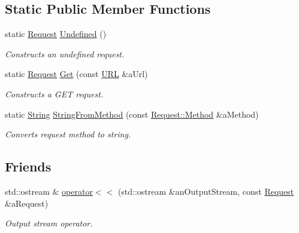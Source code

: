 \subsection*{Static Public Member Functions}
\begin{DoxyCompactItemize}
\item 
static \hyperlink{classostk_1_1io_1_1ip_1_1tcp_1_1http_1_1_request}{Request} \hyperlink{classostk_1_1io_1_1ip_1_1tcp_1_1http_1_1_request_a6364c734464bdc1244ef9de16df1ee0c}{Undefined} ()
\begin{DoxyCompactList}\small\item\em Constructs an undefined request. \end{DoxyCompactList}\item 
static \hyperlink{classostk_1_1io_1_1ip_1_1tcp_1_1http_1_1_request}{Request} \hyperlink{classostk_1_1io_1_1ip_1_1tcp_1_1http_1_1_request_affd88441e083283d9baee02e44738f5f}{Get} (const \hyperlink{classostk_1_1io_1_1_u_r_l}{U\+RL} \&a\+Url)
\begin{DoxyCompactList}\small\item\em Constructs a G\+ET request. \end{DoxyCompactList}\item 
static \hyperlink{namespaceostk_1_1io_1_1ip_1_1tcp_1_1http_a88a1b82fb01d02df64ca01ef4058bbef}{String} \hyperlink{classostk_1_1io_1_1ip_1_1tcp_1_1http_1_1_request_aebda9e8cb66ad693422238e5bad8b91a}{String\+From\+Method} (const \hyperlink{classostk_1_1io_1_1ip_1_1tcp_1_1http_1_1_request_a07a40d81f4a6fb8443c80afc11571dd3}{Request\+::\+Method} \&a\+Method)
\begin{DoxyCompactList}\small\item\em Converts request method to string. \end{DoxyCompactList}\end{DoxyCompactItemize}
\subsection*{Friends}
\begin{DoxyCompactItemize}
\item 
std\+::ostream \& \hyperlink{classostk_1_1io_1_1ip_1_1tcp_1_1http_1_1_request_a73dd714a92305cf3d0b7bdba904b3fc7}{operator$<$$<$} (std\+::ostream \&an\+Output\+Stream, const \hyperlink{classostk_1_1io_1_1ip_1_1tcp_1_1http_1_1_request}{Request} \&a\+Request)
\begin{DoxyCompactList}\small\item\em Output stream operator. \end{DoxyCompactList}\end{DoxyCompactItemize}



